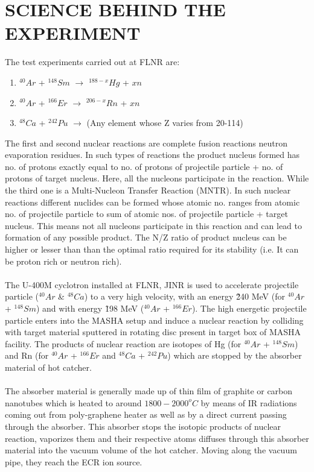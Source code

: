 \documentclass[12pt]{article}
\begin{document}
\section{SCIENCE BEHIND THE EXPERIMENT}
The test experiments carried out at FLNR are:
\begin{enumerate}
\item $^{40}Ar$ + $^{148}Sm$ $\rightarrow$ $^{188-x}Hg$ + $xn$
\item $^{40}Ar$ + $^{166}Er$ $\rightarrow$ $^{206-x}Rn$ + $xn$
\item $^{48}Ca$ + $^{242}Pu$ $\rightarrow$ (Any element whose Z varies from 20-114)
\end{enumerate}
The first and second nuclear reactions are complete fusion reactions neutron evaporation residues. In such types of reactions the product nucleus formed has no. of protons exactly equal to no. of protons of projectile particle + no. of protons of target nucleus. Here, all the nucleons participate in the reaction. While the third one is a Multi-Nucleon Transfer Reaction (MNTR). In such nuclear reactions different nuclides can be formed whose atomic no. ranges from atomic no. of projectile particle to sum of atomic nos. of projectile particle + target nucleus. This means not all nucleons participate in this reaction and can lead to formation of any possible product. The N/Z ratio of product nucleus can be higher or lesser than than the optimal ratio required for its stability (i.e. It can be proton rich or neutron rich).\\
\\
The U-400M cyclotron installed at FLNR, JINR is used to accelerate projectile particle ($^{40}Ar$ \& $^{48}Ca$) to a very high velocity, with an energy \~ 240 MeV (for $^{40}Ar$ + $^{148}Sm$) and with energy \~ 198 MeV ($^{40}Ar$ + $^{166}Er$). The high energetic projectile particle enters into the MASHA setup and induce a nuclear reaction by colliding with target material sputtered in rotating disc present in target box of MASHA facility. The products of nuclear reaction are isotopes of Hg (for $^{40}Ar$ + $^{148}Sm$)  and Rn (for $^{40}Ar$ + $^{166}Er$ and $^{48}Ca$ + $^{242}Pu$) which are stopped by the absorber material of hot catcher.\\
\\
The absorber material is generally made up of thin film of graphite or carbon nanotubes which is heated to around $1800-2000^oC$ by means of IR radiations coming out from poly-graphene heater as well as by a direct current passing through the absorber. This absorber stops the isotopic products of nuclear reaction, vaporizes them and their respective atoms diffuses through this absorber material into the vacuum volume of the hot catcher. Moving along the vacuum pipe, they reach the ECR ion source.
\end{document}
